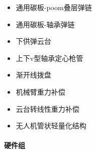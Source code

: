 
        \begin{itemize}
            \item 通用碳板-poom叠层弹链
            \item 通用碳板-轴承弹链
            \item 下供弹云台
            \item 上下v型轴承定心枪管
            \item 渐开线拨盘
            \item 机械臂重力补偿
            \item 云台转线性重力补偿
            \item 无人机管状轻量化结构
        \end{itemize}

    \paragraph{硬件组}